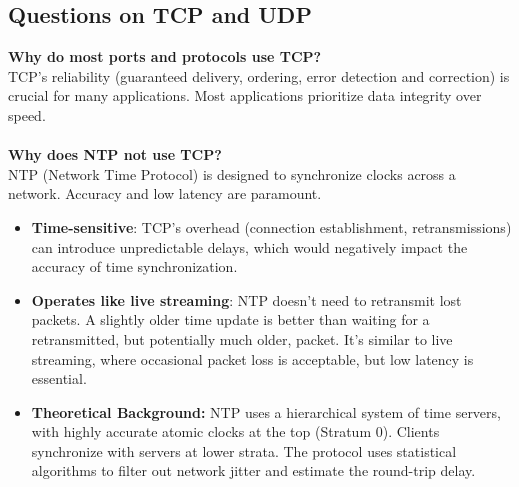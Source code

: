 \subsection{Questions on TCP and UDP}
\textbf{Why do most ports and protocols use TCP?}\\
TCP's reliability (guaranteed delivery, ordering, error detection and correction) is crucial for many applications.  Most applications prioritize data integrity over speed.\\\\
\textbf{Why does NTP not use TCP?} \\
NTP (Network Time Protocol) is designed to synchronize clocks across a network. Accuracy and low latency are paramount.

\begin{itemize}
  \item \textbf{Time-sensitive}:  TCP's overhead (connection establishment, retransmissions) can introduce unpredictable delays, which would negatively impact the accuracy of time synchronization.
    \item \textbf{Operates like live streaming}:  NTP doesn't need to retransmit lost packets.  A slightly older time update is better than waiting for a retransmitted, but potentially much older, packet.  It's similar to live streaming, where occasional packet loss is acceptable, but low latency is essential.
    \item \textbf{Theoretical Background:} NTP uses a hierarchical system of time servers, with highly accurate atomic clocks at the top (Stratum 0).  Clients synchronize with servers at lower strata.  The protocol uses statistical algorithms to filter out network jitter and estimate the round-trip delay.
\end{itemize}

